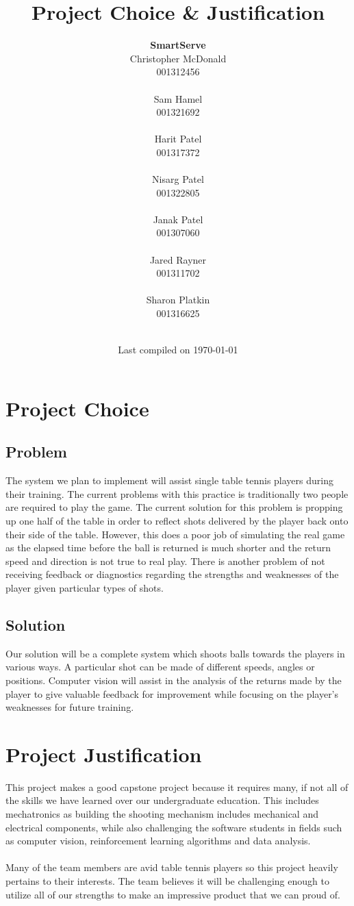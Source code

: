 \documentclass[11pt, oneside]{article}
\title{Project Choice \& Justification}
\author{
\textbf{SmartServe}\\
Christopher McDonald \\ 001312456 \\ \\ 
Sam Hamel \\ 001321692 \\ \\
Harit Patel \\ 001317372 \\ \\
Nisarg Patel \\ 001322805 \\ \\
Janak Patel \\ 001307060 \\ \\
Jared Rayner \\ 001311702 \\ \\
Sharon Platkin \\ 001316625 \\ \\
}
\date{Last compiled on \today}
\begin{document}
\maketitle
\section*{Project Choice}
\subsection*{Problem}
The system we plan to implement will assist single table tennis players during their training. The current problems with this practice is traditionally two people are required to play the game. The current solution for this problem is propping up one half of the table in order to reflect shots delivered by the player back onto their side of the table. However, this does a poor job of simulating the real game as the elapsed time before the ball is returned is much shorter and the return speed and direction is not true to real play. There is another problem of not receiving feedback or diagnostics regarding the strengths and weaknesses of the player given particular types of shots.
\subsection*{Solution}
Our solution will be a complete system which shoots balls towards the players in various ways. A particular shot can be made of different speeds, angles or positions. Computer vision will assist in the analysis of the returns made by the player to give valuable feedback for improvement while focusing on the player's weaknesses for future training.
\section*{Project Justification}
This project makes a good capstone project because it requires many, if not all of the skills we have learned over our undergraduate education. This includes mechatronics as building the shooting mechanism includes mechanical and electrical components, while also challenging the software students in fields such as computer vision, reinforcement learning algorithms and data analysis. \\ \\
Many of the team members are avid table tennis players so this project heavily pertains to their interests. The team believes it will be challenging enough to utilize all of our strengths to make an impressive product that we can proud of. 
\end{document}
